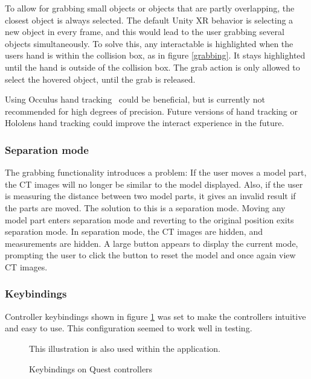 \documentclass[a4paper]{report}
\begin{document}
To allow for grabbing small objects or objects that are partly overlapping, the closest object is always selected.
The default Unity XR behavior is selecting a new object in every frame, and this would lead to the user grabbing several objects simultaneously. To solve this, any interactable is highlighted when the users hand is within the collision box, as in figure \ref{grabbing}. It stays highlighted until the hand is outside of the collision box. The grab action is only allowed to select the hovered object, until the grab is released.

Using Occulus hand tracking~\cite{noauthor_set_nodate} could be beneficial, but is currently not recommended for high degrees of precision. Future versions of hand tracking or Hololens hand tracking could improve the interact experience in the future.


\subsubsection{Separation mode}
The grabbing functionality introduces a problem: If the user moves a model part, the CT images will no longer be similar to the model displayed. Also, if the user is measuring the distance between two model parts, it gives an invalid result if the parts are moved. 
The solution to this is a separation mode. Moving any model part enters separation mode and reverting to the original position exits separation mode. In separation mode, the CT images are hidden, and measurements are hidden. A large button appears to display the current mode, prompting the user to click the button to reset the model and once again view CT images.

\subsubsection{Keybindings}
Controller keybindings shown in figure \ref{controllers} was set to make the controllers intuitive and easy to use. This configuration seemed to work well in testing.

\begin{figure}[h!]
    \centering
	\hfill
	\caption{Keybindings on Quest controllers}\label{controllers}
  \small
  This illustration is also used within the application.
\end{figure}
\end{document}
